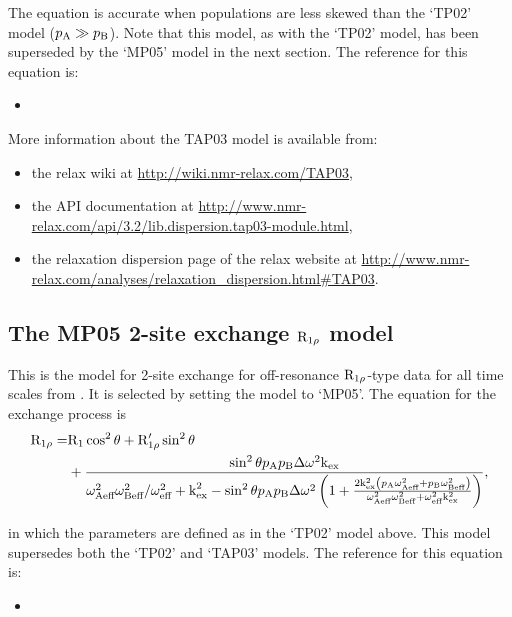The equation is accurate when populations are less skewed than the `TP02' model ($p_{\textrm{A}} \gg p_{\textrm{B}}$).
Note that this model, as with the `TP02' model, has been superseded by the `MP05' model in the next section.
The reference for this equation is:
\begin{itemize}
  \item {}
\end{itemize}

More information about the TAP03 model is available from:
\begin{itemize}
  \item the relax wiki at \url{http://wiki.nmr-relax.com/TAP03},
  \item the API documentation at \url{http://www.nmr-relax.com/api/3.2/lib.dispersion.tap03-module.html},
  \item the relaxation dispersion page of the relax website at \url{http://www.nmr-relax.com/analyses/relaxation\_dispersion.html#TAP03}.
\end{itemize}



\subsection{The MP05 2-site exchange $\mathrm{R}_{1\rho}$ model}
\label{sect: dispersion: MP05 model}

This is the model for 2-site exchange for off-resonance $\mathrm{R}_{1\rho}$-type data for all time scales from \citet{MiloushevPalmer05}.
It is selected by setting the model to `MP05'.
The equation for the exchange process is
\begin{align}
    \mathrm{R}_{1\rho} = & \mathrm{R}_1\cos^2\theta + \mathrm{R}_{1\rho}'\sin^2\theta \nonumber \\
               & + \frac{\sin^2\theta p_{\textrm{A}}p_{\textrm{B}}\Delta\omega^2\textrm{k}_{\textrm{ex}}}{\omega_{\textrm{Aeff}}^2\omega_{\textrm{Beff}}^2/\omega_{\textrm{eff}}^2 + \textrm{k}_{\textrm{ex}}^2 - \sin^2\theta p_{\textrm{A}}p_{\textrm{B}}\Delta\omega^2 \left(
                        1 + \frac{2\textrm{k}_{\textrm{ex}}^2 \left( p_{\textrm{A}}\omega_{\textrm{Aeff}}^2 + p_{\textrm{B}}\omega_{\textrm{Beff}}^2 \right)}{\omega_{\textrm{Aeff}}^2\omega_{\textrm{Beff}}^2 + \omega_{\textrm{eff}}^2\textrm{k}_{\textrm{ex}}^2}
                    \right)},
\end{align}

in which the parameters are defined as in the `TP02' model above.
This model supersedes both the `TP02' and `TAP03' models.
The reference for this equation is:
\begin{itemize}
  \item {}
\end{itemize}

